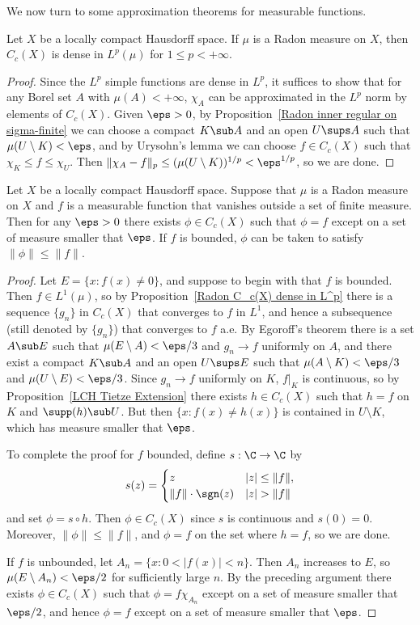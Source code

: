 We now turn to some approximation theorems for measurable functions.
\begin{proposition}\label{Radon C_c(X) dense in L^p}
Let $X$ be a locally compact Hausdorff space. If $\mu$ is a Radon measure on $X$, then $C_c(X)$ is dense in $L^p(\mu)$ for $1\leq p<+\infty$.
\end{proposition}
\begin{proof}
Since the $L^p$ simple functions are dense in $L^p$, it suffices to show that for any Borel set $A$ with $\mu(A)<+\infty$, $\chi_A$ can be approximated in the $L^p$ norm by elements of $C_c(X)$. Given $\eps>0$, by Proposition~\ref{Radon inner regular on sigma-finite} we can choose a compact $K\sub A$ and an open $U\sups A$ such that $\mu(U\setminus K)<\eps$, and by Urysohn's lemma we can choose $f\in C_c(X)$ such that $\chi_K\leq f\leq\chi_U$. Then $\|\chi_A-f\|_p\leq(\mu(U\setminus K))^{1/p}<\eps^{1/p}$, so we are done.
\end{proof}
\begin{proposition}
Let $X$ be a locally compact Hausdorff space. Suppose that $\mu$ is a Radon measure on $X$ and $f$ is a measurable function that vanishes outside a set of finite measure. Then for any $\eps>0$ there exists $\phi\in C_c(X)$ such that $\phi=f$ except on a set of measure smaller that $\eps$. If $f$ is bounded, $\phi$ can be taken to satisfy $\|\phi\|\leq\|f\|$.
\end{proposition}
\begin{proof}
Let $E=\{x:f(x)\neq 0\}$, and suppose to begin with that $f$ is bounded. Then $f\in L^1(\mu)$, so by Proposition~\ref{Radon C_c(X) dense in L^p} there is a sequence $\{g_n\}$ in $C_c(X)$ that converges to $f$ in $L^1$, and hence a subsequence (still denoted by $\{g_n\}$) that converges to $f$ a.e. By Egoroff's theorem there is a set $A\sub E$ such that $\mu(E\setminus A)<\eps/3$ and $g_n\to f$ uniformly on $A$, and there exist a compact $K\sub A$ and an open $U\sups E$ such that $\mu(A\setminus K)<\eps/3$ and $\mu(U\setminus E)<\eps/3$. Since $g_n\to f$ uniformly on $K$, $f|_K$ is continuous, so by Proposition~\ref{LCH Tietze Extension} there exists $h\in C_c(X)$ such that $h=f$ on $K$ and $\supp(h)\sub U$. But then $\{x:f(x)\neq h(x)\}$ is contained in $U\setminus K$, which has measure smaller that $\eps$.\par
To complete the proof for $f$ bounded, define $s:\C\to\C$ by
\[s(z)=\begin{cases}
z&|z|\leq\|f\|,\\
\|f\|\cdot \sgn(z)&|z|>\|f\|
\end{cases}\]
and set $\phi=s\circ h$. Then $\phi\in C_c(X)$ since $s$ is continuous and $s(0)=0$. Moreover, $\|\phi\|\leq\|f\|$, and $\phi=f$ on the set where $h=f$, so we are done.\par
If $f$ is unbounded, let $A_n=\{x:0<|f(x)|<n\}$. Then $A_n$ increases to $E$, so $\mu(E\setminus A_n)<\eps/2$ for sufficiently large $n$. By the preceding argument there exists $\phi\in C_c(X)$ such that $\phi=f\chi_{A_n}$ except on a set of measure smaller that $\eps/2$, and hence $\phi=f$ except on a set of measure smaller that $\eps$.
\end{proof}
